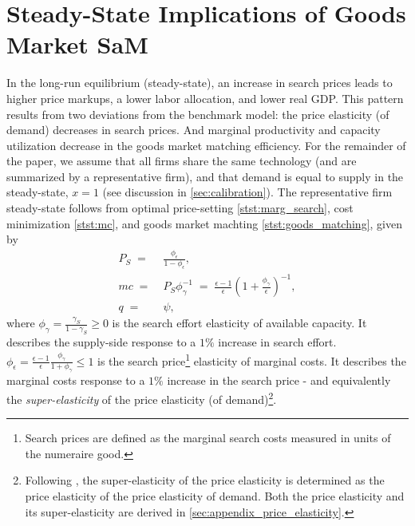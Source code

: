 \documentclass[12pt,3p,authoryear,review]{elsarticle}
\begin{document}
\section{Steady-State Implications of Goods Market SaM}\label{sec:steady_states}%
In the long-run equilibrium (steady-state), an increase in search prices leads to higher price markups, a lower labor allocation, and lower real GDP. This pattern results from two deviations from the benchmark model: the price elasticity (of demand) decreases in search prices. And marginal productivity and capacity utilization decrease in the goods market matching efficiency. For the remainder of the paper, we assume that all firms share the same technology (and are summarized by a representative firm), and that demand is equal to supply in the steady-state, $x=1$ (see discussion in \cref{sec:calibration}). The representative firm steady-state follows from optimal price-setting \eqref{stst:marg_search}, cost minimization \eqref{stst:mc}, and goods market machting \eqref{stst:goods_matching}, given by%
\begin{align}%
	P_S \; = & \; \frac{\phi_\epsilon}{1-\phi_\epsilon},\label{stst:marg_search}\\%
	mc \; = & \; P_S \phi_\gamma^{-1} \; = \; \frac{\epsilon-1}{\epsilon}\left(1+\frac{\phi_\gamma}{\epsilon}\right)^{-1},\label{stst:mc}\\%
	q \; = & \; \psi,\label{stst:goods_matching}%
\end{align}%
where $\phi_\gamma = \frac{\gamma_S}{1-\gamma_S} \geq 0$ is the search effort elasticity of available capacity. It describes the supply-side response to a $1\%$ increase in search effort. $\phi_\epsilon = \frac{\epsilon-1}{\epsilon} \frac{\phi_\gamma}{1+\phi_\gamma}\leq 1$ is the search price\footnote{Search prices are defined as the marginal search costs measured in units of the numeraire good.} elasticity of marginal costs. It describes the marginal costs response to a $1\%$ increase in the search price - and equivalently the \emph{super-elasticity} of the price elasticity (of demand)\footnote{Following \cite{beck2020price,dossche2010kinked,klenow2016real}, the super-elasticity of the price elasticity is determined as the price elasticity of the price elasticity of demand. Both the price elasticity and its super-elasticity are derived in \ref{sec:appendix_price_elasticity}.}.\\%
\end{document}
